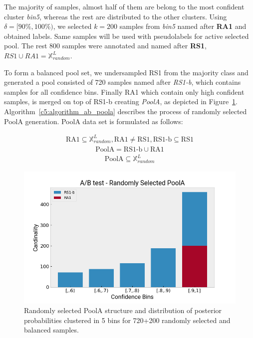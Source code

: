 The majority of samples, almost half of them are belong to the most confident cluster \textit{bin5}, whereas the rest are distributed to the other clusters.
Using $\delta=[90\%,100\%)$, we selected $k=200$ samples from \textit{bin5} named after \textbf{RA1} and obtained labels. Same samples will be used with pseudolabels for active selected pool. The rest 800 samples were annotated and named after \textbf{RS1}, $ RS1 \cup  RA1 = \mathbb{X}^L_{random}$.

To form a balanced pool set, we undersampled RS1 from the majority class and generated a pool consisted of 720 samples named after \textit{RS1-b}, which contains samples for all confidence bins. Finally RA1 which contain only high confident samples, is merged on top of RS1-b creating \textit{PoolA}, as depicted in Figure~\ref{c5:figure_ab_pool_a}. Algorithm~\ref{c5:algorithm_ab_poola} describes the process of randomly selected PoolA generation. PoolA data set is formulated as follows: 

\begin{ceqn}
\begin{align}
  \text{RA1} \subseteq \mathbb{X}^L_{random}, \text{RA1} \neq \text{RS1} , \text{RS1-b} \subseteq \text{RS1}
\end{align} 
\begin{align}
    \text{PoolA} =  \text{RS1-b} \cup \text{RA1}
\end{align} 
\begin{align}
   \text{PoolA} \subseteq  \mathbb{X}^L_{random}
\end{align} 
\label{c5:random_pool_a}
\end{ceqn}

\begin{figure}[ht!]
    \centering  
    \includegraphics[width=.65\textwidth]{figures/chap5/ab_test/dataset/pred_conf_random}
    \caption{Randomly selected PoolA structure and distribution of posterior probabilities clustered in 5 bins for 720+200 randomly selected and balanced samples.}
    \label{c5:figure_ab_pool_a}
\end{figure}


